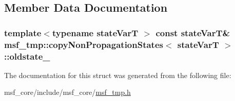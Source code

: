 \subsection{Member Data Documentation}
\hypertarget{structmsf__tmp_1_1copyNonPropagationStates_a58c1156738fad79c02bec4f3d5cd34b8}{
\subsubsection[{oldstate\-\_\-}]{\setlength{\rightskip}{0pt plus 5cm}template$<$typename state\-Var\-T $>$ const state\-Var\-T\& {\bf msf\-\_\-tmp\-::copy\-Non\-Propagation\-States}$<$ state\-Var\-T $>$\-::oldstate\-\_\-\hspace{0.3cm}{\ttfamily [private]}}}\label{structmsf__tmp_1_1copyNonPropagationStates_a58c1156738fad79c02bec4f3d5cd34b8}


The documentation for this struct was generated from the following file\-:\begin{DoxyCompactItemize}
\item 
msf\-\_\-core/include/msf\-\_\-core/\hyperlink{msf__tmp_8h}{msf\-\_\-tmp.\-h}\end{DoxyCompactItemize}
